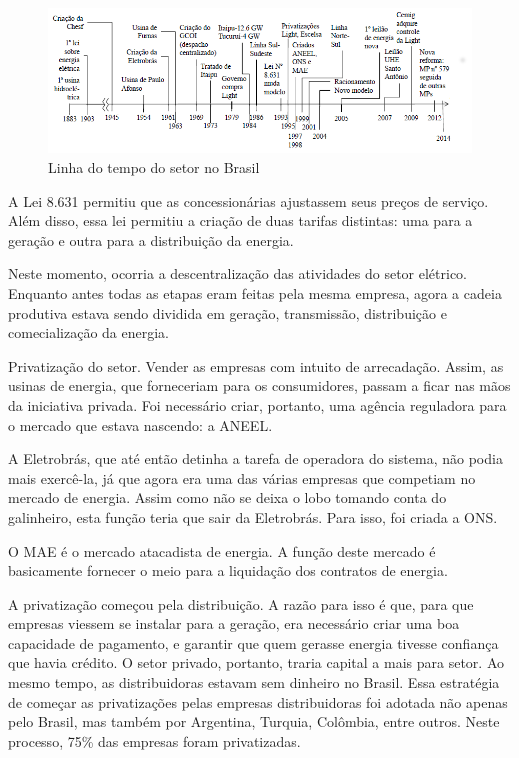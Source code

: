 \begin{figure}
\includegraphics[scale=0.75]{anexos/aula11_1}

\protect\caption{Linha do tempo do setor no Brasil \label{fig:Linha-do-tempo}}
\end{figure}


A Lei 8.631 permitiu que as concessionárias ajustassem seus preços
de serviço. Além disso, essa lei permitiu a criação de duas tarifas
distintas: uma para a geração e outra para a distribuição da energia.

Neste momento, ocorria a descentralização das atividades do setor
elétrico. Enquanto antes todas as etapas eram feitas pela mesma empresa,
agora a cadeia produtiva estava sendo dividida em geração, transmissão,
distribuição e comecialização da energia.

Privatização do setor. Vender as empresas com intuito de arrecadação.
Assim, as usinas de energia, que forneceriam para os consumidores,
passam a ficar nas mãos da iniciativa privada. Foi necessário criar,
portanto, uma agência reguladora para o mercado que estava nascendo:
a ANEEL. 

A Eletrobrás, que até então detinha a tarefa de operadora do sistema,
não podia mais exercê-la, já que agora era uma das várias empresas
que competiam no mercado de energia. Assim como não se deixa o lobo
tomando conta do galinheiro, esta função teria que sair da Eletrobrás.
Para isso, foi criada a ONS.

O MAE é o mercado atacadista de energia. A função deste mercado é
basicamente fornecer o meio para a liquidação dos contratos de energia.

A privatização começou pela distribuição. A razão para isso é que,
para que empresas viessem se instalar para a geração, era necessário
criar uma boa capacidade de pagamento, e garantir que quem gerasse
energia tivesse confiança que havia crédito. O setor privado, portanto,
traria capital a mais para setor. Ao mesmo tempo, as distribuidoras
estavam sem dinheiro no Brasil. Essa estratégia de começar as privatizações
pelas empresas distribuidoras foi adotada não apenas pelo Brasil,
mas também por Argentina, Turquia, Colômbia, entre outros. Neste processo,
75\% das empresas foram privatizadas.

